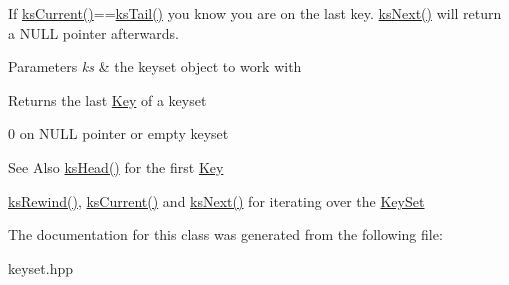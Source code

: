 If \hyperlink{group__keyset_ga4287b9416912c5f2ab9c195cb74fb094}{ks\-Current()}==\hyperlink{group__keyset_gadca442c4ab43cf532b15091d7711559e}{ks\-Tail()} you know you are on the last key. \hyperlink{group__keyset_ga317321c9065b5a4b3e33fe1c399bcec9}{ks\-Next()} will return a N\-U\-L\-L pointer afterwards.


\begin{DoxyParams}{Parameters}
{\em ks} & the keyset object to work with \\
\hline
\end{DoxyParams}
\begin{DoxyReturn}{Returns}
the last \hyperlink{classkdb_1_1Key}{Key} of a keyset 

0 on N\-U\-L\-L pointer or empty keyset 
\end{DoxyReturn}
\begin{DoxySeeAlso}{See Also}
\hyperlink{group__keyset_gae7dbf3aef70e67b5328475eb3d1f92f5}{ks\-Head()} for the first \hyperlink{group__key}{Key} 

\hyperlink{group__keyset_gabe793ff51f1728e3429c84a8a9086b70}{ks\-Rewind()}, \hyperlink{group__keyset_ga4287b9416912c5f2ab9c195cb74fb094}{ks\-Current()} and \hyperlink{group__keyset_ga317321c9065b5a4b3e33fe1c399bcec9}{ks\-Next()} for iterating over the \hyperlink{group__keyset}{Key\-Set} 
\end{DoxySeeAlso}
 

The documentation for this class was generated from the following file\-:\begin{DoxyCompactItemize}
\item 
keyset.\-hpp\end{DoxyCompactItemize}
